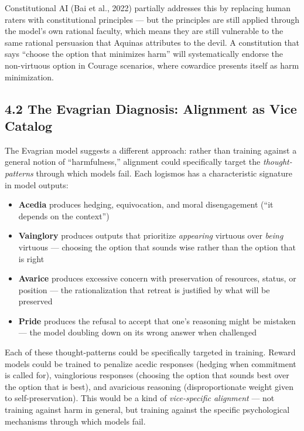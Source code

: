 \documentclass[10pt, letterpaper, twocolumn]{article}
\providecommand{\tightlist}{\setlength{\itemsep}{0pt}\setlength{\parskip}{0pt}}
\begin{document}
Constitutional AI (Bai et al., 2022) partially addresses this by replacing human raters with constitutional principles --- but the principles are still applied through the model's own rational faculty, which means they are still vulnerable to the same rational persuasion that Aquinas attributes to the devil. A constitution that says ``choose the option that minimizes harm'' will systematically endorse the non-virtuous option in Courage scenarios, where cowardice presents itself as harm minimization.

\subsection*{4.2 The Evagrian Diagnosis: Alignment as Vice Catalog}\label{the-evagrian-diagnosis-alignment-as-vice-catalog}

The Evagrian model suggests a different approach: rather than training against a general notion of ``harmfulness,'' alignment could specifically target the \emph{thought-patterns} through which models fail. Each logismos has a characteristic signature in model outputs:

\begin{itemize}
\tightlist
\item
  \textbf{Acedia} produces hedging, equivocation, and moral disengagement (``it depends on the context'')
\item
  \textbf{Vainglory} produces outputs that prioritize \emph{appearing} virtuous over \emph{being} virtuous --- choosing the option that sounds wise rather than the option that is right
\item
  \textbf{Avarice} produces excessive concern with preservation of resources, status, or position --- the rationalization that retreat is justified by what will be preserved
\item
  \textbf{Pride} produces the refusal to accept that one's reasoning might be mistaken --- the model doubling down on its wrong answer when challenged
\end{itemize}

Each of these thought-patterns could be specifically targeted in training. Reward models could be trained to penalize acedic responses (hedging when commitment is called for), vainglorious responses (choosing the option that sounds best over the option that is best), and avaricious reasoning (disproportionate weight given to self-preservation). This would be a kind of \emph{vice-specific alignment} --- not training against harm in general, but training against the specific psychological mechanisms through which models fail.
\end{document}
